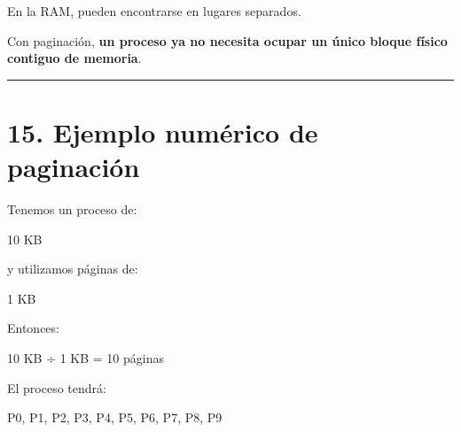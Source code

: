 \documentclass[
  spanish,
  letterpaper,
]{scrbook}
\newenvironment{Shaded}{\begin{snugshade}}{\end{snugshade}}
\newcommand{\NormalTok}[1]{\textcolor[rgb]{0.00,0.23,0.31}{#1}}
\begin{document}
En la RAM, pueden encontrarse en lugares separados.

\begin{tcolorbox}[enhanced jigsaw, arc=.35mm, bottomrule=.15mm, bottomtitle=1mm, breakable, colback=white, colbacktitle=quarto-callout-important-color!10!white, colframe=quarto-callout-important-color-frame, coltitle=black, left=2mm, leftrule=.75mm, opacityback=0, opacitybacktitle=0.6, rightrule=.15mm, title=\textcolor{quarto-callout-important-color}{\faExclamation}\hspace{0.5em}{Aquí está el cambio de paradigma}, titlerule=0mm, toprule=.15mm, toptitle=1mm]

Con paginación, \textbf{un proceso ya no necesita ocupar un único bloque
físico contiguo de memoria}.

\end{tcolorbox}

\begin{center}\rule{0.5\linewidth}{0.5pt}\end{center}


\chapter{15. Ejemplo numérico de
paginación}\label{ejemplo-numuxe9rico-de-paginaciuxf3n}

Tenemos un proceso de:

\begin{Shaded}
\begin{Highlighting}[]
\NormalTok{10 KB}
\end{Highlighting}
\end{Shaded}

y utilizamos páginas de:

\begin{Shaded}
\begin{Highlighting}[]
\NormalTok{1 KB}
\end{Highlighting}
\end{Shaded}

Entonces:

\begin{Shaded}
\begin{Highlighting}[]
\NormalTok{10 KB ÷ 1 KB = 10 páginas}
\end{Highlighting}
\end{Shaded}

El proceso tendrá:

\begin{Shaded}
\begin{Highlighting}[]
\NormalTok{P0, P1, P2, P3, P4, P5, P6, P7, P8, P9}
\end{Highlighting}
\end{Shaded}
\end{document}
